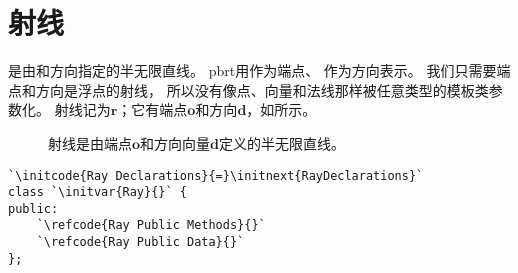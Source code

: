 \section{射线}\label{sec:射线}

是由和方向指定的半无限直线。
pbrt用作为端点、
作为方向表示。
我们只需要端点和方向是浮点的射线，
所以没有像点、向量和法线那样被任意类型的模板类参数化。
射线记为$\bm r$；它有端点$\bm o$和方向$\bm d$，如所示。
\begin{figure}[htbp]
    \centering
    \caption{射线是由端点$\bm o$和方向向量$\bm d$定义的半无限直线。}
    \label{fig:2.7}
\end{figure}

\begin{lstlisting}
`\initcode{Ray Declarations}{=}\initnext{RayDeclarations}`
class `\initvar{Ray}{}` {
public:
    `\refcode{Ray Public Methods}{}`
    `\refcode{Ray Public Data}{}`
};
\end{lstlisting}